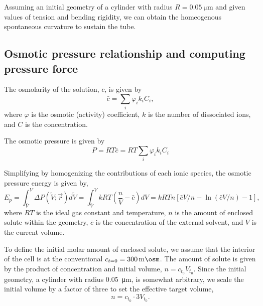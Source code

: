 \documentclass[11pt]{article}
\begin{document}
Assuming an initial geometry of a cylinder with radius \(R = \SI{0.05}{\micro\meter}\) and given values of tension and bending rigidity, we can obtain the homeogenous spontaneous curvature to sustain the tube.

\subsection{Osmotic pressure relationship and computing pressure force}

The osmolarity of the solution, \(\bar{c}\), is given by
\begin{equation}
    \bar{c} = \sum_i \varphi_i k_i C_i,
\end{equation}
where \(\varphi\) is the osmotic (activity) coefficient, \(k\) is the number of dissociated ions, and \(C\) is the concentration.

The osmotic pressure is given by
\begin{equation}
    P = RT\bar{c} = RT \sum_i  \varphi_i k_i C_i
\end{equation}

Simplifying by homogenizing the contributions of each ionic species, the osmotic pressure energy is given by,
\begin{equation}
    E_p = \int_{\bar{V}}^{V} \Delta P(\tilde{V}; \vec{r})d \tilde{V} = \int_{\bar{V}}^{V} kRT \left(\frac{n}{V} - \bar{c}\right) dV = kRTn[\bar{c}V/n - \ln(\bar{c}V/n) -1],
\end{equation}
where \(RT\) is the ideal gas constant and temperature, \(n\) is the amount of enclosed solute within the geometry, \(\bar{c}\) is the concentration of the external solvent, and \(V\) is the current volume.

To define the initial molar amount of enclosed solute, we assume that the interior of the cell is at the conventional \(c_{t=0} = \SI{300}{\milli\osm}\).
The amount of solute is given by the product of concentration and initial volume, \(n = c_{t_0}V_{t_0}\). 
Since the initial geometry, a cylinder with radius \SI{0.05}{\micro\meter}, is somewhat arbitrary, we scale the initial volume by a factor of three to set the effective target volume,
\begin{equation}
    n = c_{t_0}\cdot3V_{t_0}.
\end{equation}
\end{document}

